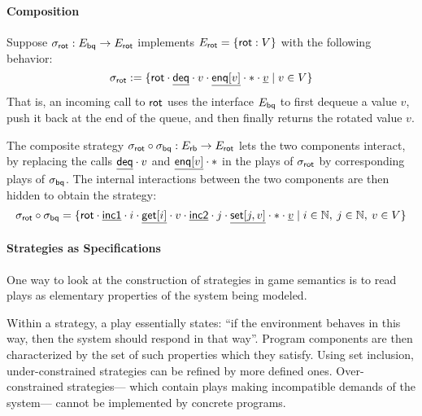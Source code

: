 \documentclass[acmsmall,review,anonymous]{acmart}\settopmatter{printfolios=true,printccs=false,printacmref=false}
\begin{document}
\paragraph{Composition} %

Suppose %
$\sigma_{ \mathsf{rot} } : E_{ \mathsf{bq} } \rightarrow E_{ \mathsf{rot} }$
implements %
$E_{ \mathsf{rot} } = \{  \mathsf{rot}  : V \}$
with the following behavior:
\[
  \sigma_{ \mathsf{rot} } := \{
     \mathsf{rot}  \cdot
    \underline{ \mathsf{deq} } \cdot
    v \cdot
    \underline{ \mathsf{enq} [v]} \cdot
    * \cdot
    \underline{v}
    \mid v \in V
  \}
\]
That is,
an incoming call to $ \mathsf{rot} $
uses the interface $E_{ \mathsf{bq} }$
to first dequeue a value $v$,
push it back at the end of the queue,
and then finally returns the rotated value $v$.

The composite strategy
$\sigma_{ \mathsf{rot} } \circ \sigma_{ \mathsf{bq} } :
 E_{ \mathsf{rb} } \rightarrow E_{ \mathsf{rot} }$
lets the two components interact,
by replacing the calls
$\underline{ \mathsf{deq} } \cdot v$
and
$\underline{ \mathsf{enq} [v]} \cdot *$
in the plays of $\sigma_{ \mathsf{rot} }$
by corresponding plays of $\sigma_{ \mathsf{bq} }$.
The internal interactions between the two components
are then hidden to obtain the strategy:
\[
  \sigma_{ \mathsf{rot} } \circ \sigma_{ \mathsf{bq} } =
  \{
     \mathsf{rot}  \cdot
    \underline{ \mathsf{inc1} } \cdot i \cdot
    \underline{ \mathsf{get} [i]} \cdot v \cdot
    \underline{ \mathsf{inc2} } \cdot j \cdot
    \underline{ \mathsf{set} [j,v]} \cdot * \cdot
    \underline{v}
  \mid
    i \in \mathbb{N}, \:
    j \in \mathbb{N}, \:
    v \in V
  \}
\]


\paragraph{Strategies as Specifications}

One way to look at the construction of strategies
in game semantics
is to read plays as elementary properties
of the system being modeled.

Within a strategy,
a play essentially states:
``if the environment behaves in this way,
then the system should respond in that way''.
Program components are then characterized by
the set of such properties which they satisfy.
Using set inclusion,
under-constrained strategies can be refined by
more defined ones.
Over-constrained strategies---%
which contain plays
making incompatible demands of the system---%
cannot be implemented by concrete programs.
\end{document}
